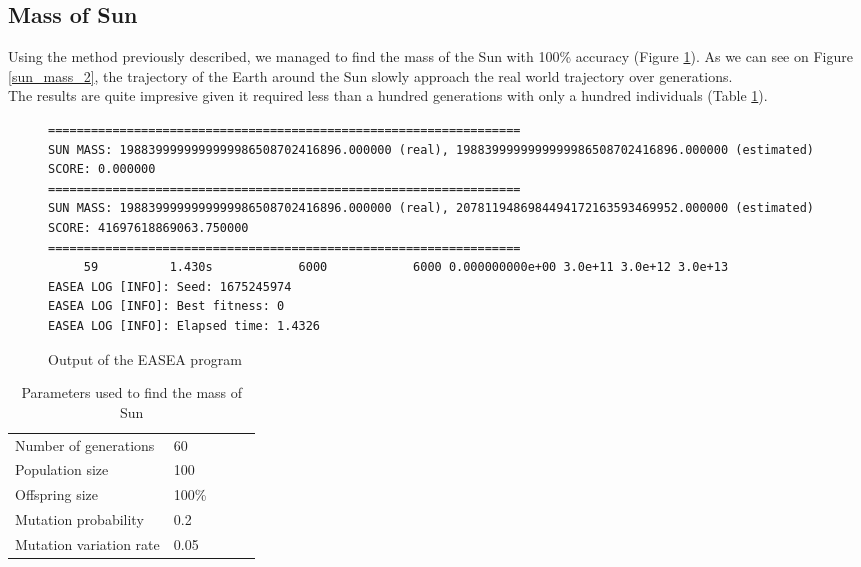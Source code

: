 \subsection{Mass of Sun}
Using the method previously described, we managed to find the mass of the Sun
with
100\% accuracy (Figure \ref{sun_mass_1}). As we can see on Figure
\ref{sun_mass_2}, the trajectory of the Earth around the Sun slowly approach
the real world trajectory over generations.\\

The results are quite impresive given it required less than a hundred
generations with only a hundred individuals (Table \ref{sun_mass_table}).

\begin{figure}
    \begin{lstlisting}
==================================================================
SUN MASS: 1988399999999999986508702416896.000000 (real), 1988399999999999986508702416896.000000 (estimated)
SCORE: 0.000000
==================================================================
SUN MASS: 1988399999999999986508702416896.000000 (real), 2078119486984494172163593469952.000000 (estimated)
SCORE: 41697618869063.750000
==================================================================
     59          1.430s            6000            6000 0.000000000e+00 3.0e+11 3.0e+12 3.0e+13
EASEA LOG [INFO]: Seed: 1675245974
EASEA LOG [INFO]: Best fitness: 0
EASEA LOG [INFO]: Elapsed time: 1.4326
\end{lstlisting}
    \caption{Output of the EASEA program}
    \label{sun_mass_1}
\end{figure}

\begin{table}
    \begin{tabular}{lllll}
        Number of generations   & 60    \\
        Population size         & 100   \\
        Offspring size          & 100\% \\
        Mutation probability    & 0.2   \\
        Mutation variation rate & 0.05
    \end{tabular}
    \caption{Parameters used to find the mass of Sun}
    \label{sun_mass_table}
\end{table}


